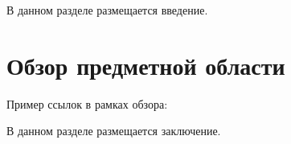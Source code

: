 \documentclass[times,specification,annotation]{itmo-student-thesis}
\begin{document}


\tableofcontents

\startprefacepage

В данном разделе размещается введение.



\chapter{Обзор предметной области}

\startrelatedwork

Пример ссылок в рамках обзора: 
\finishrelatedwork










\startconclusionpage

В данном разделе размещается заключение.

\printmainbibliography
\end{document}
